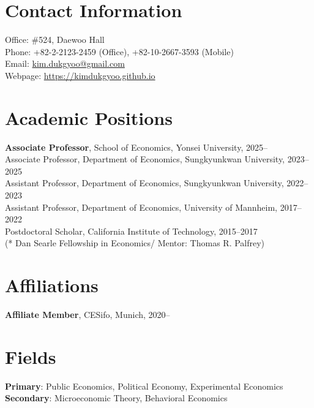 \documentclass[margin, a4paper]{res}
\begin{document}
 

\begin{resume} 
\section{Contact Information} Office: \#524, Daewoo Hall\\
Phone: +82-2-2123-2459 (Office), +82-10-2667-3593 (Mobile)\\
Email: \href{mailto:kim.dukgyoo@gmail.com}{kim.dukgyoo@gmail.com}\\
Webpage: \url{https://kimdukgyoo.github.io}

\section{Academic Positions}
\textbf{Associate Professor}, School of Economics, Yonsei University, 2025--\\
{Associate Professor}, Department of Economics, Sungkyunkwan University, 2023--2025\\
{Assistant Professor}, Department of Economics, Sungkyunkwan University, 2022--2023\\
{Assistant Professor}, Department of Economics, University of Mannheim, 2017--2022\\
{Postdoctoral Scholar}, California Institute of Technology, 2015--2017\\
(* Dan Searle Fellowship in Economics/ Mentor: Thomas R. Palfrey)

\section{Affiliations}
\textbf{Affiliate Member}, CESifo, Munich, 2020--

\section{Fields}
\textbf{Primary}: Public Economics, Political Economy, Experimental Economics\\
\textbf{Secondary}: Microeconomic Theory, Behavioral Economics


\end{resume}
\end{document}
